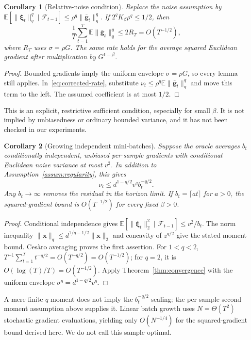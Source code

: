 \documentclass{article}
\newtheorem{corollary}{Corollary}
\begin{document}
\begin{corollary}[Relative-noise condition]\label{cor:growth}
Replace the noise assumption by
$\mathbb E[\|\bm{\xi}_t\|_q^q\mid\mathcal F_{t-1}]\le\rho^q\|\bar{\mathbf{g}}_t\|_q^q$.
If $2^qK_\beta\rho^q\le1/2$, then
\begin{equation}
\frac1T\sum_{t=1}^T\mathbb E\|\bar{\mathbf{g}}_t\|_q^q\le2R_T=O(T^{-1/2}),
\end{equation}
where $R_T$ uses $\sigma=\rho G$. The same rate holds for the average squared Euclidean gradient after multiplication by $G^{1-\beta}$.
\end{corollary}
\begin{proof}
Bounded gradients imply the uniform envelope $\sigma=\rho G$, so every lemma still applies. In~\eqref{eq:corrected-rate}, substitute $\nu_t\le\rho^q\mathbb E\|\bar{\mathbf{g}}_t\|_q^q$ and move this term to the left. The assumed coefficient is at most $1/2$.
\end{proof}
This is an explicit, restrictive sufficient condition, especially for small $\beta$. It is not implied by unbiasedness or ordinary bounded variance, and it has not been checked in our experiments.

\begin{corollary}[Growing independent mini-batches]\label{cor:batch}
Suppose the oracle averages $b_t$ conditionally independent, unbiased per-sample gradients with conditional Euclidean noise variance at most $v^2$. In addition to Assumption~\ref{assum:regularity}, this gives
\begin{equation}
\nu_t\le d^{1-q/2}v^q b_t^{-q/2}.
\end{equation}
Any $b_t\to\infty$ removes the residual in the horizon limit. If $b_t=\lceil a t\rceil$ for $a>0$, the squared-gradient bound is $O(T^{-1/2})$ for every fixed $\beta>0$.
\end{corollary}
\begin{proof}
Conditional independence gives $\mathbb E[\|\bm{\xi}_t\|_2^2\mid\mathcal F_{t-1}]\le v^2/b_t$. The norm inequality $\|\mathbf{x}\|_q\le d^{1/q-1/2}\|\mathbf{x}\|_2$ and concavity of $z^{q/2}$ give the stated moment bound. Ces\`aro averaging proves the first assertion. For $1<q<2$, $T^{-1}\sum_{t=1}^Tt^{-q/2}=O(T^{-q/2})=O(T^{-1/2})$; for $q=2$, it is $O(\log(T)/T)=O(T^{-1/2})$. Apply Theorem~\ref{thm:convergence} with the uniform envelope $\sigma^q=d^{1-q/2}v^q$.
\end{proof}
A mere finite $q$-moment does not imply the $b_t^{-q/2}$ scaling; the per-sample second-moment assumption above supplies it. Linear batch growth uses $N=\Theta(T^2)$ stochastic gradient evaluations, yielding only $O(N^{-1/4})$ for the squared-gradient bound derived here. We do not call this sample-optimal.
\end{document}

